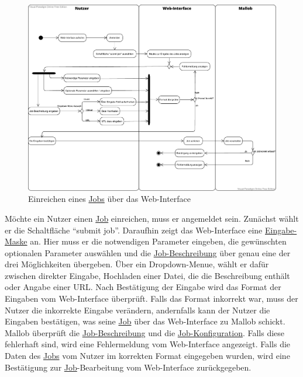 \begin{figure}[H]
    \centering
    \includegraphics[width=\textwidth]{images-interface/v3_aktivitaetsdiagramme/Job_einreichen_v11.pdf}
    \caption{Einreichen eines \hyperref[B:Jobs]{Jobs} über das \gls{Web-Interface}}
\end{figure}
Möchte ein \gls{Nutzer} einen \hyperref[B:Jobs]{Job} einreichen, muss er angemeldet sein. Zunächst wählt er die Schaltfläche \enquote{submit job}. Daraufhin zeigt das \gls{Web-Interface} eine \hyperref[pages:submit-job]{Eingabe-Maske} an. Hier muss er die notwendigen Parameter eingeben, die gewünschten optionalen Parameter auswählen und die \hyperref[B:Job-Beschreibung]{Job-Beschreibung} über genau eine der drei Möglichkeiten übergeben. Über ein \gls{Dropdown-Menue}, wählt er dafür zwischen direkter Eingabe, Hochladen einer Datei, die die Beschreibung enthält oder Angabe einer URL. Nach Bestätigung der Eingabe wird das Format der Eingaben vom \gls{Web-Interface} überprüft. Falls das Format inkorrekt war, muss der \gls{Nutzer} die inkorrekte Eingabe verändern, andernfalls kann der \gls{Nutzer} die Eingaben bestätigen, was seine \hyperref[B:Jobs]{Job} über das \gls{Web-Interface} zu Mallob schickt. Mallob überprüft die \hyperref[B:Job-Beschreibung]{Job-Beschreibung} und die \hyperref[B:Job-Konfiguration]{Job-Konfiguration}. Falls diese fehlerhaft sind, wird eine Fehlermeldung vom \gls{Web-Interface} angezeigt. Falls die Daten des \hyperref[B:Jobs]{Jobs} vom \gls{Nutzer} im korrekten Format eingegeben wurden, wird eine Bestätigung zur \hyperref[B:Jobs]{Job}-Bearbeitung vom \gls{Web-Interface} zurückgegeben.

